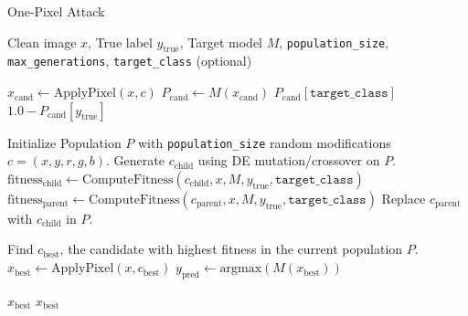 \documentclass[../main.tex]{subfiles}
\begin{document}
\begin{breakablealgorithm}{One-Pixel Attack}
\label{alg:one_pixel_attack_general}
\begin{algorithmic}[1]
\Require Clean image $x$, True label $y_{\mathrm{true}}$, Target model $M$, \texttt{population\_size}, \texttt{max\_generations}, \texttt{target\_class} (optional)

    \State $x_{\mathrm{cand}} \gets \text{ApplyPixel}(x, c)$
    \State $P_{\mathrm{cand}} \gets M(x_{\mathrm{cand}})$ 
        \State \Return $P_{\mathrm{cand}}[\texttt{target\_class}]$ 
    \Else
        \State \Return $1.0 - P_{\mathrm{cand}}[y_{\mathrm{true}}]$ 
    \EndIf
\EndFunction

\State Initialize Population $P$ with \texttt{population\_size} random modifications $c = (x, y, r, g, b)$.
        \State Generate $c_{\mathrm{child}}$ using DE mutation/crossover on $P$.
        \State $\mathrm{fitness}_{\mathrm{child}} \gets \text{ComputeFitness}(c_{\mathrm{child}}, x, M, y_{\mathrm{true}}, \texttt{target\_class})$
        \State $\mathrm{fitness}_{\mathrm{parent}} \gets \text{ComputeFitness}(c_{\mathrm{parent}}, x, M, y_{\mathrm{true}}, \texttt{target\_class})$
            \State Replace $c_{\mathrm{parent}}$ with $c_{\mathrm{child}}$ in $P$.
        \EndIf
    \EndFor
    
    \State Find $c_{\mathrm{best}}$, the candidate with highest fitness in the current population $P$.
    \State $x_{\mathrm{best}} \gets \text{ApplyPixel}(x, c_{\mathrm{best}})$
    \State $y_{\mathrm{pred}} \gets \text{argmax}(M(x_{\mathrm{best}}))$ 
    
        \State \Return $x_{\mathrm{best}}$ 
    \EndIf
\EndFor
\State \Return $x_{\mathrm{best}}$ 
\end{algorithmic}
\end{breakablealgorithm}
\end{document}
